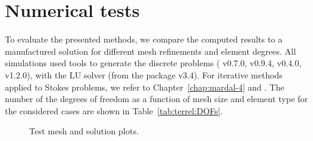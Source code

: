 \section{Numerical tests}
\label{sec:terrel:Results}

To evaluate the presented methods, we compare the computed results to
a manufactured solution for different mesh refinements and element
degrees. All simulations used \fenics{} tools to generate the
discrete problems (\ffc{} v0.7.0, \dolfin{} v0.9.4, \ufl{} v0.4.0,
\ufc{} v1.2.0), with the  LU solver (from the
 package v3.4).  For iterative methods
applied to Stokes problems, we refer to Chapter~\ref{chap:mardal-4}
and \citet{ElmanSilvesterWathen2005}.  The number of the degrees of
freedom as a function of mesh size and element type for the considered
cases are shown in Table~\ref{tab:terrel:DOFs}.

\begin{figure}
\center
{}
\qquad
{}
\qquad
{}
\caption{Test mesh and solution plots.}
\label{fig:terrel:meshsolution}
\end{figure}

